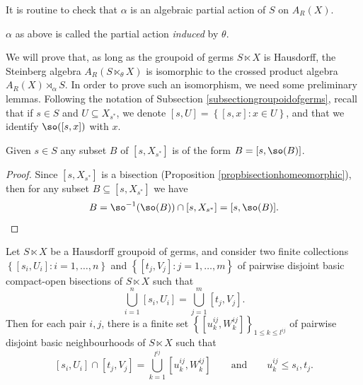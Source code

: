 It is routine to check that $\alpha$ is an algebraic partial action of $S$ on $A_R(X)$.

\begin{definition}\label{definitiondualpartialaction}
$\alpha$ as above is called the partial action \emph{induced} by $\theta$.
\end{definition}

We will prove that, as long as the groupoid of germs $S \ltimes X$ is Hausdorff, the Steinberg algebra $A_R(S\ltimes_\theta X)$ is isomorphic to the crossed product algebra $A_R(X) \rtimes_\alpha S$. In order to prove such an isomorphism, we need some preliminary lemmas. Following the notation of Subsection \ref{subsectiongroupoidofgerms}, recall that if $s\in S$ and $U\subseteq X_{s^*}$, we denote $[s,U]=\left\{[s,x]:x\in U\right\}$, and that we identify $\so([s,x])$ with $x$.

\begin{lemma}\label{lem:basicelementsubset}
Given $s\in S$ any subset $B$ of $[s,X_{s^*}]$ is of the form $B=[s,\so(B)]$.
\end{lemma}

\begin{proof}
Since $[s,X_{s^*}]$ is a bisection (Proposition \ref{propbisectionhomeomorphic}), then for any subset $B\subseteq[s,X_{s^*}]$ we have
\[B=\so^{-1}(\so(B))\cap[s,X_{s^*}]=[s,\so(B)].\qedhere\]
\end{proof}


\begin{lemma}\label{lem:unionbasicelements}
Let $S\ltimes X$ be a Hausdorff groupoid of germs, and consider two finite collections $\left\lbrace\left[s_i,U_i\right]:i=1,\ldots,n\right\}$ and $\left\lbrace\left[t_j,V_j\right]:j=1,\ldots,m\right\rbrace$ of pairwise disjoint basic compact-open bisections of $S\ltimes X$ such that 
\[\bigcup_{i=1}^n\left[s_i,U_i\right]=\bigcup_{j=1}^m\left[t_j,V_j\right].\]
Then for each pair $i,j$, there is a finite set  $\left\lbrace\left[u_k^{ij},W_k^{ij}\right]\right\rbrace_{1\leq k\leq l^{ij}}$ of pairwise disjoint basic neighbourhoods of $S\ltimes X$ such that 
\[\left[s_i,U_i\right]\cap\left[t_j,V_j\right]=\bigcup_{k=1}^{l^{ij}}\left[u_k^{ij},W_k^{ij}\right]\qquad\text{and}\qquad u_k^{ij} \leq s_i,t_j.\]
\end{lemma}

